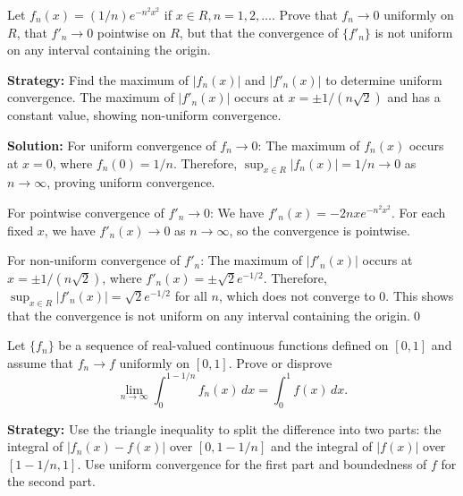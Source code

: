 \begin{problembox}
\begin{problemstatement}
Let \( f_n(x) = (1/n)e^{-n^2x^2} \) if \( x \in R, n = 1, 2, \ldots \). Prove that \( f_n \to 0 \) uniformly on \( R \), that \( f'_n \to 0 \) pointwise on \( R \), but that the convergence of \(\{f'_n\}\) is not uniform on any interval containing the origin.
\end{problemstatement}
\end{problembox}

\noindent\textbf{Strategy:} Find the maximum of \( |f_n(x)| \) and \( |f'_n(x)| \) to determine uniform convergence. The maximum of \( |f'_n(x)| \) occurs at \( x = \pm 1/(n\sqrt{2}) \) and has a constant value, showing non-uniform convergence.

\bigskip\noindent\textbf{Solution:} For uniform convergence of \( f_n \to 0 \): The maximum of \( f_n(x) \) occurs at \( x = 0 \), where \( f_n(0) = 1/n \). Therefore, \( \sup_{x \in R} |f_n(x)| = 1/n \to 0 \) as \( n \to \infty \), proving uniform convergence.

For pointwise convergence of \( f'_n \to 0 \): We have \( f'_n(x) = -2nxe^{-n^2x^2} \). For each fixed \( x \), we have \( f'_n(x) \to 0 \) as \( n \to \infty \), so the convergence is pointwise.

For non-uniform convergence of \( f'_n \): The maximum of \( |f'_n(x)| \) occurs at \( x = \pm 1/(n\sqrt{2}) \), where \( f'_n(x) = \pm \sqrt{2}e^{-1/2} \). Therefore, \( \sup_{x \in R} |f'_n(x)| = \sqrt{2}e^{-1/2} \) for all \( n \), which does not converge to 0. This shows that the convergence is not uniform on any interval containing the origin.\qed


\begin{problembox}
\begin{problemstatement}
Let \(\{f_n\}\) be a sequence of real-valued continuous functions defined on \([0, 1]\) and assume that \( f_n \to f \) uniformly on \([0, 1]\). Prove or disprove
\[\lim_{n \to \infty} \int_0^{1 - 1/n} f_n(x) \, dx = \int_0^1 f(x) \, dx.\]
\end{problemstatement}
\end{problembox}

\noindent\textbf{Strategy:} Use the triangle inequality to split the difference into two parts: the integral of \( |f_n(x) - f(x)| \) over \([0, 1-1/n]\) and the integral of \( |f(x)| \) over \([1-1/n, 1]\). Use uniform convergence for the first part and boundedness of \( f \) for the second part.

